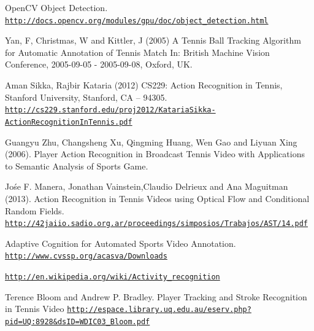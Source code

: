 \documentclass[10.5pt]{article}
\begin{document}
\begin{thebibliography}{99}

OpenCV Object Detection. \\
\href{http://docs.opencv.org/modules/gpu/doc/object\_detection.html}{\texttt{http://docs.opencv.org/modules/gpu/doc/object\_detection.html}}

Yan, F, Christmas, W and Kittler, J (2005) A Tennis Ball Tracking Algorithm for Automatic Annotation of Tennis Match In: British Machine Vision Conference, 2005-09-05 - 2005-09-08, Oxford, UK.

Aman Sikka, Rajbir Kataria (2012) CS229: Action Recognition in Tennis, Stanford University, Stanford, CA -- 94305.\\
\href{http://cs229.stanford.edu/proj2012/KatariaSikka-ActionRecognitionInTennis.pdf}{\texttt{http://cs229.stanford.edu/proj2012/KatariaSikka-ActionRecognitionInTennis.pdf}}

Guangyu Zhu, Changsheng Xu, Qingming Huang, Wen Gao and Liyuan Xing (2006). Player Action Recognition in Broadcast Tennis Video with Applications to Semantic Analysis of Sports Game. 

Jo\'se F. Manera, Jonathan Vainstein,Claudio Delrieux and Ana Maguitman (2013). Action Recognition in Tennis Videos using Optical Flow and Conditional Random Fields.
\href{http://42jaiio.sadio.org.ar/proceedings/simposios/Trabajos/AST/14.pdf}{\texttt{http://42jaiio.sadio.org.ar/proceedings/simposios/Trabajos/AST/14.pdf}}

Adaptive Cognition  for Automated Sports Video Annotation.\\
\href{http://www.cvssp.org/acasva/Downloads}{\texttt{http://www.cvssp.org/acasva/Downloads}}

\bibitem{}
\href{http://en.wikipedia.org/wiki/Activity\_recognition}{\texttt{http://en.wikipedia.org/wiki/Activity\_recognition}}

\bibitem{}
Terence Bloom and Andrew P. Bradley. Player Tracking and Stroke Recognition in Tennis Video
\href{{http://espace.library.uq.edu.au/eserv.php?pid=UQ:8928\&dsID=WDIC03\_Bloom.pdf}}{\texttt{http://espace.library.uq.edu.au/eserv.php?pid=UQ:8928\&dsID=WDIC03\_Bloom.pdf}}

\end{thebibliography}
\end{document}
